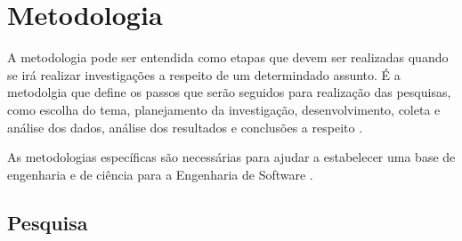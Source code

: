 \chapter{Metodologia}

A metodologia pode ser entendida como etapas que devem ser realizadas quando se irá realizar investigações a respeito de um determindado assunto. É a metodolgia que define os passos que serão seguidos para realização das pesquisas, como escolha do tema, planejamento da investigação, desenvolvimento, coleta e análise dos dados, análise dos resultados e conclusões a respeito \cite{Moresi:2003}.

As metodologias específicas são necessárias para ajudar a estabelecer uma base de engenharia e de ciência para a Engenharia de Software \cite{Wohlin:2000}.

\section{Pesquisa}
